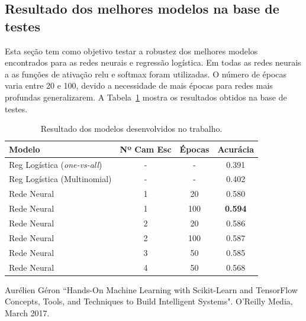 \documentclass[conference]{IEEEtran}
\begin{document}
\subsection{Resultado dos melhores modelos na base de testes}

Esta seção tem como objetivo testar a robustez dos melhores modelos encontrados para as redes neurais e regressão logística. Em todas as redes neurais a as funções de ativação relu e softmax foram utilizadas. O número de épocas varia entre 20 e 100, devido a necessidade de mais épocas para redes mais profundas generalizarem. A Tabela~\ref{tab:result} mostra os resultados obtidos na base de testes.

\begin{table}[h!]
	\centering
	
	\begin{tabular}{lccc} \toprule
		\textbf{Modelo} & \textbf{Nº Cam Esc} & \textbf{Épocas} & \textbf{Acurácia}    \\ \toprule 	
		Reg Logística (\emph{one-vs-all}) & - & - & 0.391 \\
		Reg Logística (Multinomial) & - & - & 0.402 \\  \toprule 
	    Rede Neural & 1 & 20  & 0.580 \\
   	    Rede Neural & 1 & 100 & \textbf{0.594} \\
	    Rede Neural & 2 & 20  & 0.586 \\
	    Rede Neural & 2 & 100 & 0.587 \\
	    Rede Neural & 3 & 50  & 0.585 \\
   	    Rede Neural & 4 & 50 &  0.568\\
	    
		\bottomrule      
	\end{tabular}
	\caption{Resultado dos modelos desenvolvidos no trabalho.}
	\label{tab:result}
\end{table}

\begin{thebibliography}{00}
 Aurélien Géron ``Hands-On Machine Learning with Scikit-Learn and TensorFlow
Concepts, Tools, and Techniques to Build Intelligent Systems". O'Reilly Media, March 2017.
\end{thebibliography}
\end{document}
